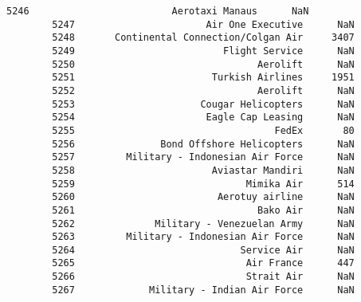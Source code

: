 \documentclass[11pt]{article}
\begin{document}
\begin{Verbatim}[commandchars=\\\{\}]
        5246                         Aerotaxi Manaus      NaN   
        5247                       Air One Executive      NaN   
        5248       Continental Connection/Colgan Air     3407   
        5249                          Flight Service      NaN   
        5250                                Aerolift      NaN   
        5251                        Turkish Airlines     1951   
        5252                                Aerolift      NaN   
        5253                      Cougar Helicopters      NaN   
        5254                       Eagle Cap Leasing      NaN   
        5255                                   FedEx       80   
        5256               Bond Offshore Helicopters      NaN   
        5257         Military - Indonesian Air Force      NaN   
        5258                        Aviastar Mandiri      NaN   
        5259                              Mimika Air      514   
        5260                         Aerotuy airline      NaN   
        5261                                Bako Air      NaN   
        5262              Military - Venezuelan Army      NaN   
        5263         Military - Indonesian Air Force      NaN   
        5264                             Service Air      NaN   
        5265                              Air France      447   
        5266                              Strait Air      NaN   
        5267             Military - Indian Air Force      NaN   
        

\end{Verbatim}
\end{document}
